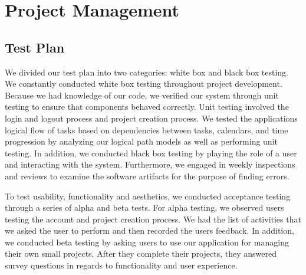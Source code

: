 \chapter{Project Management}

\section{Test Plan}
We divided our test plan into two categories: white box and black box testing. We constantly conducted white box testing throughout project development. Because we had knowledge of our code, we verified our system through unit testing to ensure that components behaved correctly. Unit testing involved the login and logout process and project creation process. We tested the application\textsc{}s logical flow of tasks based on dependencies between tasks, calendars, and time progression by analyzing our logical path models as well as performing unit testing. In addition, we conducted black box testing by playing the role of a user and interacting with the system. Furthermore, we engaged in weekly inspections and reviews to examine the software artifacts for the purpose of finding errors. \par To test usability, functionality and aesthetics, we conducted acceptance testing through a series of alpha and beta tests. For alpha testing, we observed users testing the account and project creation process. We had the list of activities that we asked the user to perform and then recorded the user\textsc{}s feedback. In addition, we conducted beta testing by asking users to use our application for managing their own small projects. After they complete their projects, they answered survey questions in regards to functionality and user experience.

